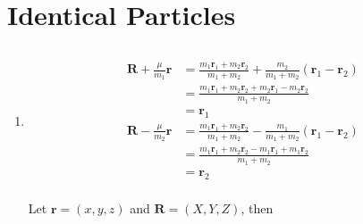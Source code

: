 \documentclass{article}
\renewcommand{\vec}[1]{\boldsymbol{\mathbf{#1}}}
\begin{document}
\section{Identical Particles}

\subsection{}

\begin{enumerate}
  \item

        \begin{align*}
          \vec{R} + \frac{\mu}{m_1} \vec{r} & = \frac{m_1 \vec{r}_1 + m_2 \vec{r}_2}{m_1 + m_2} + \frac{m_2}{m_1 + m_2} (\vec{r}_1 - \vec{r}_2) \\
                                            & = \frac{m_1 \vec{r}_1 + m_2 \vec{r}_2 + m_2 \vec{r}_1 - m_2 \vec{r}_2}{m_1 + m_2}                 \\
                                            & = \vec{r}_1                                                                                       \\
          \vec{R} - \frac{\mu}{m_2} \vec{r} & = \frac{m_1 \vec{r}_1 + m_2 \vec{r}_2}{m_1 + m_2} - \frac{m_1}{m_1 + m_2} (\vec{r}_1 - \vec{r}_2) \\
                                            & = \frac{m_1 \vec{r}_1 + m_2 \vec{r}_2 - m_1 \vec{r}_1 + m_1 \vec{r}_2}{m_1 + m_2}                 \\
                                            & = \vec{r}_2                                                                                       \\
        \end{align*}

        Let $\vec{r} = (x, y, z)$ and $\vec{R} = (X, Y, Z)$, then


\end{enumerate}
\end{document}
